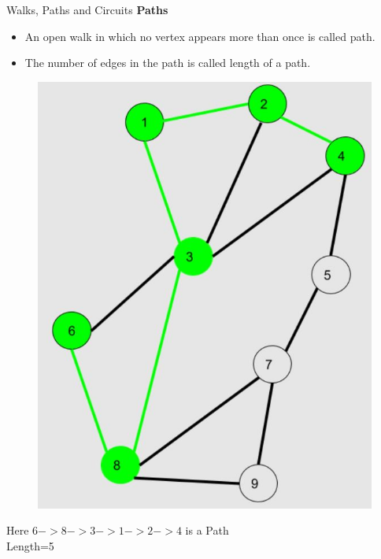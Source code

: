 \documentclass{beamer}
\begin{document}
\begin{frame}{Walks, Paths and Circuits}
\textbf{Paths}
\begin{itemize}
	\item An open walk in which no vertex appears more than once is called path.
	\item The 
	number of edges in the path is called length of a path. 
\end{itemize}
\begin{figure}
	\includegraphics[scale=.2]{img/m27}
\end{figure}
Here $6->8->3->1->2->4$ is a Path\\
Length=5
\end{frame}
\end{document}
